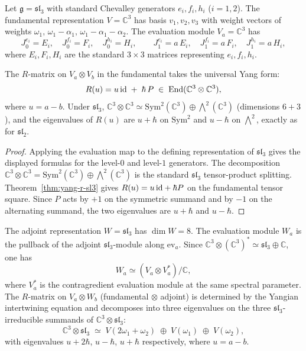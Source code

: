\begin{computation}
\label{comp:sl3-eval-fundamental}
Let $\mathfrak{g}=\mathfrak{sl}_3$ with standard Chevalley
generators $e_i,f_i,h_i$ ($i=1,2$). The fundamental
representation $V=\mathbb{C}^3$ has basis $v_1,v_2,v_3$
with weight vectors of weights $\omega_1,\,\omega_1-\alpha_1,\,
\omega_1-\alpha_1-\alpha_2$. The evaluation module
$V_a=\mathbb{C}^3$ has
\[
J^{e_i}_0=E_i,\quad J^{f_i}_0=F_i,\quad J^{h_i}_0=H_i,
\qquad
J^{e_i}_1=a\,E_i,\quad J^{f_i}_1=a\,F_i,\quad J^{h_i}_1=a\,H_i,
\]
where $E_i,F_i,H_i$ are the standard $3\times 3$ matrices
representing $e_i,f_i,h_i$.

The $R$-matrix on $V_a\otimes V_b$ in the fundamental takes
the universal Yang form:
\begin{equation}\label{eq:sl3-R-fund}
R(u)
=
u\,\mathrm{id}\;+\;\hbar\,P
\;\in\;
\operatorname{End}(\mathbb{C}^3\otimes\mathbb{C}^3),
\end{equation}
where $u=a-b$. Under $\mathfrak{sl}_3$,
$\mathbb{C}^3\otimes\mathbb{C}^3
\simeq\mathrm{Sym}^2(\mathbb{C}^3)\oplus\bigwedge^2(\mathbb{C}^3)$
\textup{(}dimensions $6+3$\textup{)}, and the eigenvalues of
$R(u)$ are $u+\hbar$ on $\mathrm{Sym}^2$ and $u-\hbar$
on $\bigwedge^2$, exactly as for $\mathfrak{sl}_2$.
\end{computation}

\begin{proof}
Applying the evaluation map to the defining representation of
$\mathfrak{sl}_3$ gives the displayed formulas for the level-$0$ and
level-$1$ generators.
The decomposition
$\mathbb C^3\otimes\mathbb C^3
=\mathrm{Sym}^2(\mathbb C^3)\oplus\bigwedge^2(\mathbb C^3)$
is the standard $\mathfrak{sl}_3$ tensor-product splitting.
Theorem~\ref{thm:yang-r-sl3} gives
$R(u)=u\,\mathrm{id}+\hbar P$ on the fundamental tensor square.
Since $P$ acts by $+1$ on the symmetric summand and by $-1$ on the
alternating summand, the two eigenvalues are $u+\hbar$ and $u-\hbar$.
\end{proof}

\begin{computation}
\label{comp:sl3-eval-adjoint}
The adjoint representation $W=\mathfrak{sl}_3$ has
$\dim W=8$. The evaluation module $W_a$ is the pullback
of the adjoint $\mathfrak{sl}_3$-module along
$\mathrm{ev}_a$. Since
$\mathbb{C}^3\otimes(\mathbb{C}^3)^*\simeq
\mathfrak{sl}_3\oplus\mathbb{C}$, one has
\[
W_a\simeq (V_a\otimes V^*_a)/\mathbb{C},
\]
where $V^*_a$ is the contragredient evaluation module at the
same spectral parameter. The $R$-matrix on $V_a\otimes W_b$
\textup{(}fundamental $\otimes$ adjoint\textup{)} is determined by
the Yangian intertwining equation and decomposes into three
eigenvalues on the three $\mathfrak{sl}_3$-irreducible summands
of $\mathbb{C}^3\otimes\mathfrak{sl}_3$:
\[
\mathbb{C}^3\otimes\mathfrak{sl}_3
\;\simeq\;
V(2\omega_1+\omega_2)\;\oplus\;V(\omega_1)\;\oplus\;V(\omega_2),
\]
with eigenvalues $u+2\hbar$, $u-\hbar$, $u+\hbar$
respectively, where $u=a-b$.
\end{computation}

